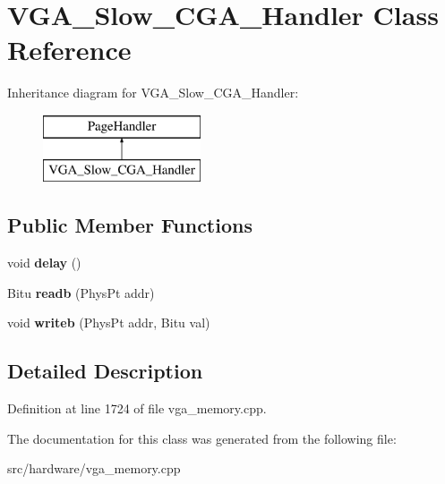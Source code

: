 \hypertarget{classVGA__Slow__CGA__Handler}{\section{V\-G\-A\-\_\-\-Slow\-\_\-\-C\-G\-A\-\_\-\-Handler Class Reference}
\label{classVGA__Slow__CGA__Handler}
}
Inheritance diagram for V\-G\-A\-\_\-\-Slow\-\_\-\-C\-G\-A\-\_\-\-Handler\-:\begin{figure}[H]
\begin{center}
\leavevmode
\includegraphics[height=2.000000cm]{classVGA__Slow__CGA__Handler}
\end{center}
\end{figure}
\subsection*{Public Member Functions}
\begin{DoxyCompactItemize}
\item 
\hypertarget{classVGA__Slow__CGA__Handler_af8dd584b1fbb765acffe039b47f21181}{void {\bfseries delay} ()}\label{classVGA__Slow__CGA__Handler_af8dd584b1fbb765acffe039b47f21181}

\item 
\hypertarget{classVGA__Slow__CGA__Handler_a0724a16ab5641b5436d5505a81438d47}{Bitu {\bfseries readb} (Phys\-Pt addr)}\label{classVGA__Slow__CGA__Handler_a0724a16ab5641b5436d5505a81438d47}

\item 
\hypertarget{classVGA__Slow__CGA__Handler_a26591aafbb6125366d6e5607ae330077}{void {\bfseries writeb} (Phys\-Pt addr, Bitu val)}\label{classVGA__Slow__CGA__Handler_a26591aafbb6125366d6e5607ae330077}

\end{DoxyCompactItemize}


\subsection{Detailed Description}


Definition at line 1724 of file vga\-\_\-memory.\-cpp.



The documentation for this class was generated from the following file\-:\begin{DoxyCompactItemize}
\item 
src/hardware/vga\-\_\-memory.\-cpp\end{DoxyCompactItemize}
